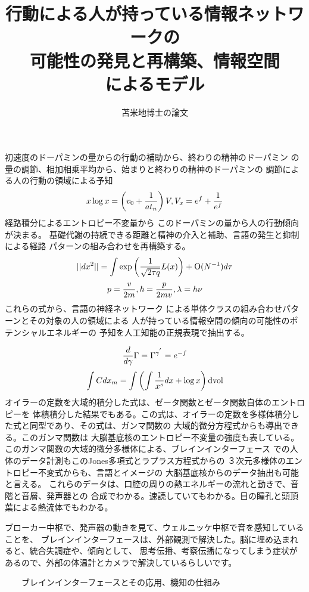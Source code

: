 \documentclass{jsarticle}
\begin{document}
\title{行動による人が持っている情報ネットワークの \\
可能性の発見と再構築、情報空間 \\
によるモデル}
\author{苫米地博士の論文}

      初速度のドーパミンの量からの行動の補助から、終わりの精神のドーパミン
  の量の調節、相加相乗平均から、始まりと終わりの精神のドーパミンの
  調節による人の行動の領域による予知
  $$ x \log x = \left(v_0 + {1 \over at_n}\right)V, V_x = e^f + {1 \over e^f} $$
     経路積分によるエントロピー不変量から
  このドーパミンの量から人の行動傾向が決まる。
  基礎代謝の持続できる距離と精神の介入と補助、言語の発生と抑制による経路
  パターンの組み合わせを再構築する。
  $$ ||dx^2|| = \int {\mathrm{exp}\left({1 \over \sqrt{2 \tau q}}L(x)
  \right) + \mathrm{O}(N^{-1})}d \tau   $$
  $$ p = {v \over 2m}, \hbar = {p \over 2mv}, \lambda = h \nu $$
     これらの式から、言語の神経ネットワーク
  による単体クラスの組み合わせパターンとその対象の人の領域による
  人が持っている情報空間の傾向の可能性のポテンシャルエネルギーの
  予知を人工知能の正規表現で抽出する。
   
  $$ {d \over d \gamma}\Gamma = \Gamma^{{\gamma}^{'}} = e^{-f}  $$
  $$ \int Cdx_m = \int \left(\int {1 \over x^s}dx + \log x \right)\mathrm{dvol} $$
     オイラーの定数を大域的積分した式は、ゼータ関数とゼータ関数自体のエントロピーを
  体積積分した結果でもある。この式は、オイラーの定数を多様体積分した式と同型であり、その式は、ガンマ関数の
  大域的微分方程式からも導出できる。このガンマ関数は
  大脳基底核のエントロピー不変量の強度も表している。
  このガンマ関数の大域的微分多様体による、ブレインインターフェース
  での人体のデータ計測もこのJones多項式とラプラス方程式からの
  ３次元多様体のエントロピー不変式からも、言語とイメージの
  大脳基底核からのデータ抽出も可能と言える。
  これらのデータは、口腔の周りの熱エネルギーの流れと動きで、音階と音層、発声器との
  合成でわかる。速読していてもわかる。目の瞳孔と頭頂葉による熱流体でもわかる。


      ブローカー中枢で、発声器の動きを見て、ウェルニッケ中枢で音を感知していることを、
   ブレインインターフェースは、外部観測で解決した。脳に埋め込まれると、統合失調症や、傾向として、
   思考伝播、考察伝播になってしまう症状があるので、外部の体温計とカメラで解決しているらしいです。





　　ブレインインターフェースとその応用、機知の仕組み
\end{document}
